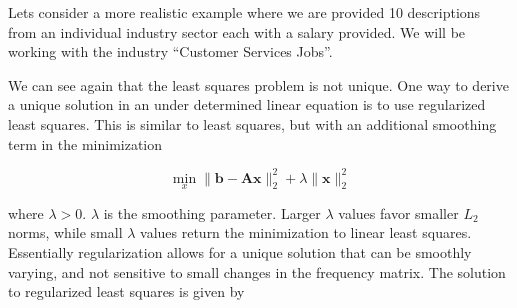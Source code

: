 \documentclass[12pt]{article}
\begin{document}
    Lets consider a more realistic example where we are provided 10
    descriptions from an individual industry sector each with a salary
    provided. We will be working with the industry ``Customer Services Jobs''. 
    
    \begin{center} 
        
        
    \end{center}

    We can see again that the least squares problem is not unique. One
    way to derive a unique solution in an under determined linear equation is
    to use regularized least squares. This is similar to least squares, but
    with an additional smoothing term in the minimization

    \begin{equation}
        \min_x \|\bm{b} - \bm{Ax}\|_2^2 + \lambda\|\bm{x}\|_2^2
    \end{equation}

    \noindent where $\lambda > 0$. $\lambda$ is the smoothing parameter. Larger
    $\lambda$ values favor smaller $L_2$ norms, while small $\lambda$ values
    return the minimization to linear least squares.  Essentially
    regularization allows for a unique solution that can be smoothly varying,
    and not sensitive to small changes in the frequency matrix. The solution to
    regularized least squares is given by
\end{document}

